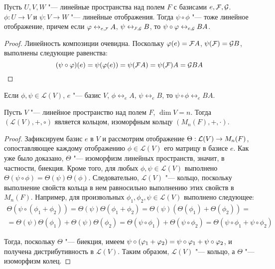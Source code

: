 \begin{proposition}
	Пусть $U, V, W$ "--- линейные пространства над полем $F$ с базисами $e, \FF , \GG $. $\phi: U \rightarrow V$ и $\psi: V \rightarrow W$ "--- линейные отображения. Тогда $\psi \circ \phi$ "--- тоже линейное отображение, причем если $\phi \leftrightarrow_{e, \FFF} A$, $\psi \leftrightarrow_{\FFF , \GGG} B$, то $\psi \circ \phi \leftrightarrow_{e, \GGG} BA$.
\end{proposition}

\begin{proof}
	Линейность композиции очевидна. Поскольку $\phi(e) = \FF A$, $\psi(\FF ) = \GG B$, выполнены следующие равенства:
	\[(\psi \circ \phi)(e) = \psi(\phi(e)) = \psi(\FF A) = \psi(\FF )A = \GG BA\qedhere\]
\end{proof}

\begin{corollary}
	Если $\phi, \psi \in \mathcal{L}(V)$, $e$ "--- базис $V$, $\phi \leftrightarrow_{e} A$, $\psi \leftrightarrow_{e} B$, то $\psi \circ \phi \leftrightarrow_{e} BA$.
\end{corollary}

\begin{corollary}
	Пусть $V$ "--- линейное пространство над полем $F$, $\dim{V} = n$. Тогда $(\mathcal{L}(V), +, \circ)$ является кольцом, изоморфным кольцу $(M_n(F), +, \cdot)$.
\end{corollary}

\begin{proof}
	Зафиксируем базис $e$ в $V$ и рассмотрим отображение $\Theta: \mathcal{L}(V) \hm{\rightarrow} M_n(F)$, сопоставляющее каждому отображению $\phi \in \mathcal{L}(V)$ его матрицу в базисе $e$. Как уже было доказано, $\Theta$ "--- изоморфизм линейных пространств, значит, в частности, биекция. Кроме того, для любых $\phi, \psi \in \mathcal L(V)$ выполнено $\Theta(\psi \circ \phi) = \Theta(\psi)\Theta(\phi)$. Следовательно, $\mathcal{L}(V)$ "--- кольцо, поскольку выполнение свойств кольца в нем равносильно выполнению этих свойств в $M_n(F)$. Например, для произвольных $ \phi_1, \phi_2, \psi \in \mathcal L(V)$ выполнено следующее:
	\begin{multline*}
	\Theta(\psi \circ (\phi_1 + \phi_2)) = \Theta(\psi)\Theta(\phi_1 + \phi_2) = \Theta(\psi)(\Theta(\phi_1) + \Theta(\phi_2)) =\\ = \Theta(\psi)\Theta(\phi_1) + \Theta(\psi)\Theta(\phi_2) = \Theta(\psi \circ \phi_1) + \Theta(\psi \circ \phi_2) = \Theta(\psi \circ \phi_1 + \psi \circ \phi_2)
	\end{multline*}
	
	Тогда, поскольку $\Theta$ "--- биекция, имеем $\psi \circ (\phi_1 + \phi_2) \hm{=} \psi \circ \phi_1 + \psi \circ \phi_2$, и получена дистрибутивность в $\mathcal L (V)$. Таким образом, $\mathcal{L}(V)$ "--- кольцо, а $\Theta$ "--- изоморфизм колец.
\end{proof}

